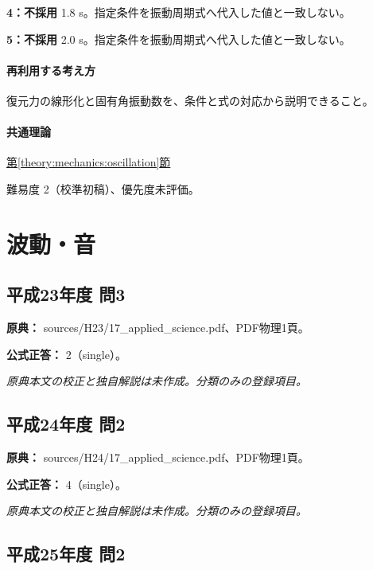\noindent\textbf{4：不採用} 1.8 s。指定条件を振動周期式へ代入した値と一致しない。\par

\noindent\textbf{5：不採用} 2.0 s。指定条件を振動周期式へ代入した値と一致しない。\par

\paragraph{再利用する考え方} 復元力の線形化と固有角振動数を、条件と式の対応から説明できること。

\paragraph{共通理論} \hyperref[theory:mechanics:oscillation]{第\ref*{theory:mechanics:oscillation}節}

\par 難易度 2（校準初稿）、優先度未評価。

\section{波動・音}

\subsection{平成23年度 問3}
\label{q:h23-reg-applied-03}

\noindent\textbf{原典：} sources/H23/17\_applied\_science.pdf、PDF物理1頁。

\textbf{公式正答：} 2（single）。

\par\textit{原典本文の校正と独自解説は未作成。分類のみの登録項目。}

\subsection{平成24年度 問2}
\label{q:h24-reg-applied-02}

\noindent\textbf{原典：} sources/H24/17\_applied\_science.pdf、PDF物理1頁。

\textbf{公式正答：} 4（single）。

\par\textit{原典本文の校正と独自解説は未作成。分類のみの登録項目。}

\subsection{平成25年度 問2}
\label{q:h25-reg-applied-02}

